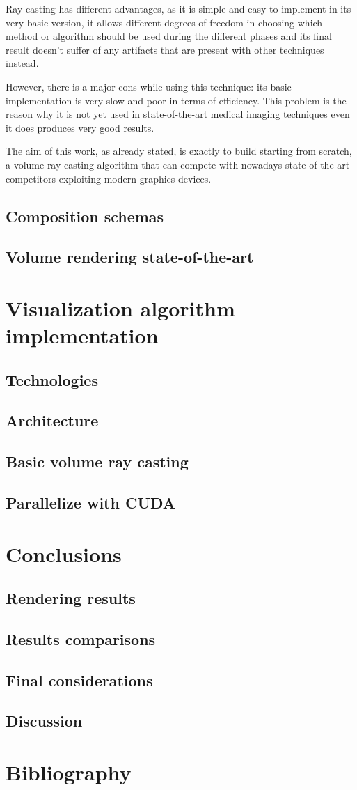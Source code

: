 \documentclass[10pt,a4paper]{article}
\begin{document}
Ray casting has different advantages, as it is simple and easy to implement in its very basic version, it allows different degrees of freedom in choosing which method or algorithm should be used during the different phases and its final result doesn't suffer of any artifacts that are present with other techniques instead.

However, there is a major cons while using this technique: its basic implementation is very slow and poor in terms of efficiency. This problem is the reason why it is not yet used in state-of-the-art medical imaging techniques even  it does produces very good results.

The aim of this work, as already stated, is exactly to build starting from scratch, a volume ray casting algorithm that can compete with nowadays state-of-the-art competitors exploiting modern graphics devices.

\subsection{Composition schemas}


\subsection{Volume rendering state-of-the-art} %
\section{Visualization algorithm implementation} 
\subsection{Technologies} %
\subsection{Architecture} %
\subsection{Basic volume ray casting} %
\subsection{Parallelize with CUDA} %
\section{Conclusions} 
\subsection{Rendering results} %
\subsection{Results comparisons} %
\subsection{Final considerations} %
\subsection{Discussion} %
\section{Bibliography}
\end{document}
